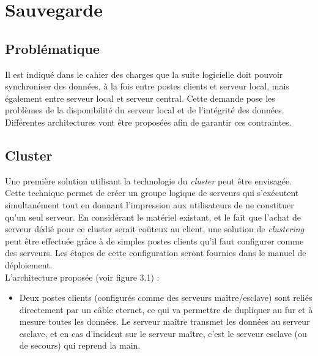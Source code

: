 \section{Sauvegarde}

% 

\subsection{Problématique}

Il est indiqué dans le cahier des charges que la suite logicielle doit pouvoir synchroniser des données, à la fois entre postes clients et serveur local, mais également entre serveur local et serveur central.
Cette demande pose les problèmes de la disponibilité du serveur local et de l'intégrité des données. Différentes architectures vont être proposées afin de garantir ces contraintes.

\subsection{Cluster}

Une première solution utilisant la technologie du \textit{cluster} peut être envisagée. Cette technique permet de créer un groupe logique de serveurs qui s'exécutent simultanément tout en donnant l'impression aux utilisateurs de ne constituer qu'un seul serveur.
En considérant le matériel existant, et le fait que l'achat de serveur dédié pour ce cluster serait coûteux au client, une solution de \textit{clustering} peut être effectuée grâce à de simples postes clients qu'il faut configurer comme des serveurs. Les étapes de cette configuration seront fournies dans le manuel de déploiement.
\\
L'architecture proposée (voir figure 3.1) :
\begin{itemize}
	\item Deux postes clients (configurés comme des serveurs maître/esclave) sont reliés directement par un câble eternet, ce qui va permettre de dupliquer au fur et à mesure toutes les données. Le serveur maître transmet les données au serveur esclave, et en cas d'incident sur le serveur maître, c'est le serveur esclave (ou de secours) qui reprend la main.
\end{itemize}



